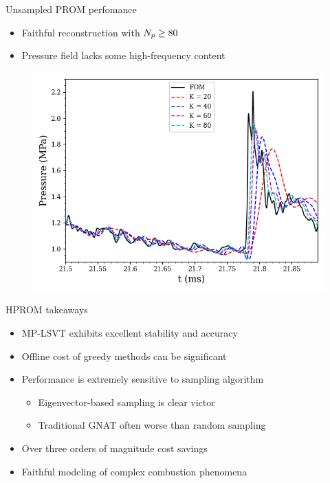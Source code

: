 \documentclass[]{beamer}
\begin{document}
\begin{frame}{Unsampled PROM perfomance}
	\begin{itemize}
		\item Faithful reconstruction with $N_p \ge 80$
		\item Pressure field lacks some high-frequency content
	\end{itemize}
	\begin{figure}
		\begin{minipage}{0.49\linewidth}
			\includegraphics[width=0.99\linewidth]{Images/experiments/9elem/point_3_Static_Pressure.png}
		\end{minipage}
		\begin{minipage}{0.45\linewidth}
		\end{minipage}
	\end{figure}
\end{frame}

\begin{frame}{HPROM takeaways}
	\begin{itemize}
		\item MP-LSVT exhibits excellent stability and accuracy
		\item Offline cost of greedy methods can be significant
		\item Performance is extremely sensitive to sampling algorithm
		\begin{itemize}
			\item Eigenvector-based sampling is clear victor
			\item Traditional GNAT often worse than random sampling
		\end{itemize}
		\item Over three orders of magnitude cost savings
		\item Faithful modeling of complex combustion phenomena
	\end{itemize}
\end{frame}
\end{document}
